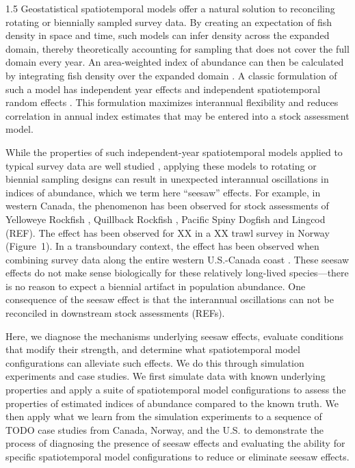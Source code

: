 \documentclass[11pt]{article}
\begin{document}
\begin{spacing}{1.5}
Geostatistical spatiotemporal models offer a natural solution to reconciling rotating or biennially sampled survey data.
By creating an expectation of fish density in space and time, such models can infer density across the expanded domain, thereby theoretically accounting for sampling that does not cover the full domain every year.
An area-weighted index of abundance can then be calculated by integrating fish density over the expanded domain \citep{thorson2015Geostatistical, thorsonSpatioTemporalModels2024,andersonsdmTMB2025}.
A classic formulation of such a model has independent year effects and independent spatiotemporal random effects \citep{thorson2015Geostatistical}.
This formulation maximizes interannual flexibility and reduces correlation in annual index estimates that may be entered into a stock assessment model.

While the properties of such independent-year spatiotemporal models applied to typical survey data are well studied \citep[e.g.,][]{thorson2015Geostatistical, yalcinExploringLimits2023}, applying these models to rotating or biennial sampling designs can result in unexpected interannual oscillations in indices of abundance, which we term here ``seesaw'' effects.
For example, in western Canada, the phenomenon has been observed for stock assessments of Yelloweye Rockfish \citep{haggarty2021yelloweyeinside}, Quillback Rockfish \citep{huynh2025quillbackoutside}, Pacific Spiny Dogfish \citep{andersonPacificSpiny2026} and Lingcod (REF). 
The effect has been observed for XX in a XX trawl survey in Norway (Figure~1).
In a transboundary context, the effect has been observed when combining survey data along the entire western U.S.-Canada coast \citep{wardWinLose2024}.
These seesaw effects do not make sense biologically for these relatively long-lived species---there is no reason to expect a biennial artifact in population abundance.
One consequence of the seesaw effect is that the interannual oscillations can not be reconciled in downstream stock assessments (REFs).

Here, we diagnose the mechanisms underlying seesaw effects, evaluate conditions that modify their strength, and determine what spatiotemporal model configurations can alleviate such effects. 
We do this through simulation experiments and case studies. 
We first simulate data with known underlying properties and apply a suite of spatiotemporal model configurations to assess the properties of estimated indices of abundance compared to the known truth. 
We then apply what we learn from the simulation experiments to a sequence of TODO case studies from Canada, Norway, and the U.S. to demonstrate the process of diagnosing the presence of seesaw effects and evaluating the ability for specific spatiotemporal model configurations to reduce or eliminate seesaw effects.


\end{spacing}
\end{document}
